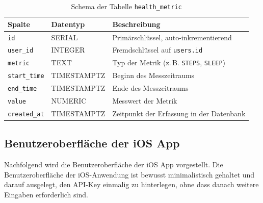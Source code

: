 \documentclass[12pt,a4paper]{report}
\begin{document}
\begin{table}[H]
\centering
\begin{tabular}{|l|l|p{9cm}|}
\hline
\textbf{Spalte} & \textbf{Datentyp} & \textbf{Beschreibung} \\
\hline
\texttt{id} & SERIAL & Primärschlüssel, auto-inkrementierend \\
\texttt{user\_id} & INTEGER & Fremdschlüssel auf \texttt{users.id} \\
\texttt{metric} & TEXT & Typ der Metrik (z.\,B. \texttt{STEPS}, \texttt{SLEEP}) \\
\texttt{start\_time} & TIMESTAMPTZ & Beginn des Messzeitraums \\
\texttt{end\_time} & TIMESTAMPTZ & Ende des Messzeitraums \\
\texttt{value} & NUMERIC & Messwert der Metrik \\
\texttt{created\_at} & TIMESTAMPTZ & Zeitpunkt der Erfassung in der Datenbank \\
\hline
\end{tabular}
\caption{Schema der Tabelle \texttt{health\_metric}}
\label{tab:health_metric_schema}
\end{table}

\subsection{Benutzeroberfläche der iOS App}

Nachfolgend wird die Benutzeroberfläche der iOS App vorgestellt. Die Benutzeroberfläche der iOS-Anwendung ist bewusst
minimalistisch gehaltet und darauf ausgelegt, den API-Key einmalig zu hinterlegen, ohne dass danach weitere Eingaben erforderlich
sind.
\end{document}
